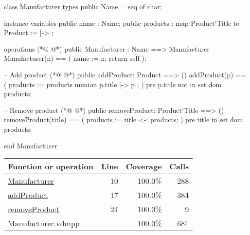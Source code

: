 \begin{vdmpp}[breaklines=true]
class Manufacturer
types
 public Name = seq of char;
 
instance variables
 public name : Name;
 public products : map Product`Title to Product := { |-> };
 
operations
(*@
\label{Manufacturer:10}
@*)
 public Manufacturer : Name ==> Manufacturer
 Manufacturer(n) == (
  name := n;
   return self
 );
 
 -- Add product
(*@
\label{addProduct:17}
@*)
 public addProduct: Product ==> ()
 addProduct(p) == (
  products := products munion { p.title |-> p };
 )
 pre p.title not in set dom products;
 
 -- Remove product
(*@
\label{removeProduct:24}
@*)
 public removeProduct: Product`Title ==> ()
 removeProduct(title) == (
  products := {title} <-: products;
 )
 pre title in set dom products;

end Manufacturer
\end{vdmpp}
\bigskip
\begin{longtable}{|l|r|r|r|}
\hline
Function or operation & Line & Coverage & Calls \\
\hline
\hline
\hyperref[Manufacturer:10]{Manufacturer} & 10&100.0\% & 288 \\
\hline
\hyperref[addProduct:17]{addProduct} & 17&100.0\% & 384 \\
\hline
\hyperref[removeProduct:24]{removeProduct} & 24&100.0\% & 9 \\
\hline
\hline
Manufacturer.vdmpp & & 100.0\% & 681 \\
\hline
\end{longtable}

